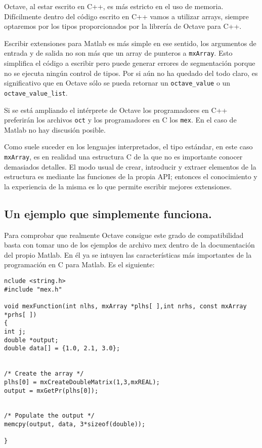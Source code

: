 Octave, al estar escrito en C++, es más estricto en el uso de
memoria. Difícilmente dentro del código escrito en C++ vamos a
utilizar arrays, siempre optaremos por los tipos proporcionados por la
librería de Octave para C++.

Escribir extensiones para Matlab es más simple en ese sentido, los
argumentos de entrada y de salida no son más que un array de punteros
a \texttt{mxArray}.  Esto simplifica el código a escribir pero puede
generar errores de segmentación porque no se ejecuta ningún control de
tipos. Por si aún no ha quedado del todo claro, es significativo que
en Octave sólo se pueda retornar un \texttt{octave_value} o un
\texttt{octave_value_list}.

Si se está ampliando el intérprete de Octave los programadores en C++
preferirán los archivos \texttt{oct} y los programadores en C los
\texttt{mex}. En el caso de Matlab no hay discusión posible.

Como suele suceder en los lenguajes interpretados, el tipo estándar,
en este caso \texttt{mxArray}, es en realidad una estructura C de la
que no es importante conocer demasiados detalles.  El modo usual de
crear, introducir y extraer elementos de la estructura es mediante las
funciones de la propia API; entonces el conocimiento y la experiencia
de la misma es lo que permite escribir mejores extensiones.

\subsection{Un ejemplo que simplemente funciona.}

Para comprobar que realmente Octave consigue este grado de
compatibilidad basta con tomar uno de los ejemplos de archivo mex
dentro de la documentación del propio Matlab.  En él ya se intuyen las
características más importantes de la programación en C para
Matlab. Es el siguiente:

\begin{verbatim}
nclude <string.h>
#include "mex.h"

void mexFunction(int nlhs, mxArray *plhs[ ],int nrhs, const mxArray *prhs[ ])
{
int j;
double *output;
double data[] = {1.0, 2.1, 3.0};


/* Create the array */
plhs[0] = mxCreateDoubleMatrix(1,3,mxREAL);
output = mxGetPr(plhs[0]);


/* Populate the output */
memcpy(output, data, 3*sizeof(double));

}
\end{verbatim}

